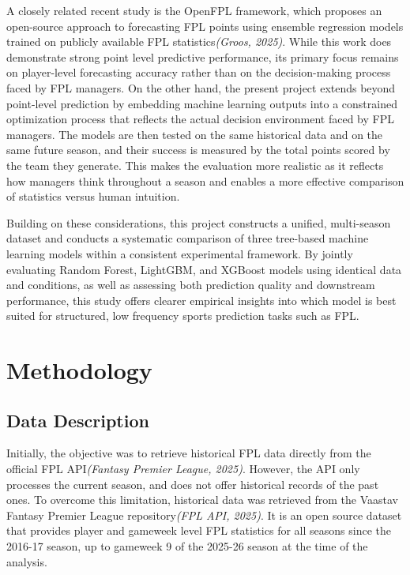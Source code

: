 \documentclass[11pt,a4paper]{article}
\begin{document}
A closely related recent study is the OpenFPL framework, which proposes an open-source approach to forecasting FPL points using ensemble regression models trained on publicly available FPL statistics\textit{(Groos, 2025)}. While this work does demonstrate strong point level predictive performance, its primary focus remains on player-level forecasting accuracy rather than on the decision-making process faced by FPL managers. On the other hand, the present project extends beyond point-level prediction by embedding machine learning outputs into a constrained optimization process that reflects the actual decision environment faced by FPL managers. The models are then tested on the same historical data and on the same future season, and their success is measured by the total points scored by the team they generate. This makes the evaluation more realistic as it reflects how managers think throughout a season and enables a more effective comparison of statistics versus human intuition. 

Building on these considerations, this project constructs a unified, multi-season dataset and conducts a systematic comparison of three tree-based machine learning models within a consistent experimental framework. By jointly evaluating Random Forest, LightGBM, and XGBoost models using identical data and conditions, as well as assessing both prediction quality and downstream performance, this study offers clearer empirical insights into which model is best suited for structured, low frequency sports prediction tasks such as FPL. 

\section{Methodology}
\label{sec:methodology}

\subsection{Data Description}
Initially, the objective was to retrieve historical FPL data directly from the official FPL API\textit{(Fantasy Premier League, 2025)}. However, the API only processes the current season, and does not offer historical records of the past ones. To overcome this limitation, historical data was retrieved from the Vaastav Fantasy Premier League repository\textit{(FPL API, 2025)}. It is an open source dataset that provides player and gameweek level FPL statistics for all seasons since the 2016-17 season, up to gameweek 9 of the 2025-26 season at the time of the analysis. 
\end{document}
